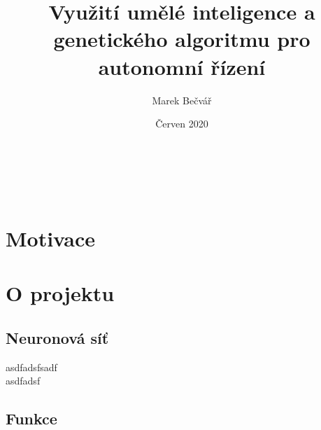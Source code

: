 \documentclass[a4paper,12pt]{article}
\title{Využití umělé inteligence a genetického algoritmu pro autonomní řízení}
\author{Marek Bečvář}
\date{Červen 2020}
\renewcommand{\maketitle}
{
    \begin{center}
        \vspace*{2cm}
        \LARGE{\textbf{\thetitle}}\\
        \vspace{0.5cm}
        \Large{\textbf{\theauthor}}\\
        \vspace{0.5cm}
        \normalsize{\thedate}
    \end{center}
}
\begin{document}
    \maketitle

    \vspace{0.5cm}

    \section{Motivace}
        \blindtext

    \section{O projektu}
        \begin{center}
            \blindtext
        \end{center}

    \subsection{Neuronová síť}
        asdfadsfsadf\\
        asdfadsf

    \subsection{Funkce}
        \blindtext
\end{document}
